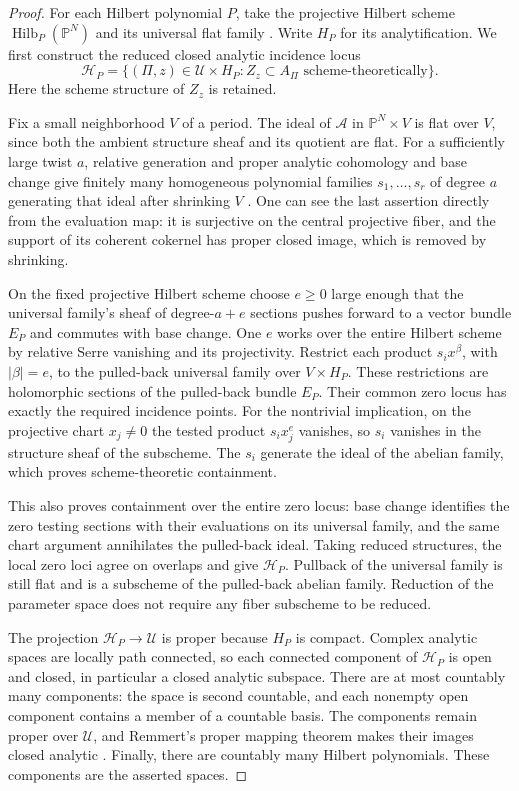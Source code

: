 \begin{proof}
For each Hilbert polynomial $P$, take the projective Hilbert scheme
$\operatorname{Hilb}_P(\mathbb P^N)$ and its universal flat family
\cite{grothendieck-hilbert}.  Write $H_P$ for its analytification.  We
first construct the reduced closed analytic incidence locus
\[
 \mathcal H_P=\{(\Pi,z)\in\mathcal U\times H_P:
                     Z_z\subset A_\Pi\text{ scheme-theoretically}\}.
\]
Here the scheme structure of $Z_z$ is retained.

Fix a small neighborhood $V$ of a period.  The ideal of $\mathscr A$
in $\mathbb P^N\times V$ is flat over $V$, since both the ambient
structure sheaf and its quotient are flat.  For a sufficiently large
twist $a$, relative generation and proper analytic cohomology and base
change give finitely many homogeneous polynomial families
$s_1,\ldots,s_r$ of degree $a$ generating that ideal after shrinking
$V$ \cite{grauert-remmert}.  One can see the last assertion directly
from the evaluation map: it is surjective on the central projective
fiber, and the support of its coherent cokernel has proper closed image,
which is removed by shrinking.

On the fixed projective Hilbert scheme choose $e\ge0$ large enough that
the universal family's sheaf of degree-$a+e$ sections pushes forward to
a vector bundle $E_P$ and commutes with base change.  One $e$ works
over the entire Hilbert scheme by relative Serre vanishing and its
projectivity.  Restrict each product $s_i x^\beta$, with $|\beta|=e$,
to the pulled-back universal family over $V\times H_P$.  These
restrictions are holomorphic sections of the pulled-back bundle $E_P$.
Their common zero locus has exactly the required incidence points.
For the nontrivial implication, on the projective chart $x_j\ne0$ the
tested product $s_i x_j^e$ vanishes, so $s_i$ vanishes in the structure
sheaf of the subscheme.  The $s_i$ generate the ideal of the abelian
family, which proves scheme-theoretic containment.

This also proves containment over the entire zero locus: base change
identifies the zero testing sections with their evaluations on its
universal family, and the same chart argument annihilates the pulled-back
ideal.  Taking reduced structures, the local zero loci agree on overlaps
and give $\mathcal H_P$.  Pullback of the universal family is still flat
and is a subscheme of the pulled-back abelian family.  Reduction of the
parameter space does not require any fiber subscheme to be reduced.

The projection $\mathcal H_P\to\mathcal U$ is proper because $H_P$ is
compact.  Complex analytic spaces are locally path connected, so each
connected component of $\mathcal H_P$ is open and closed, in particular
a closed analytic subspace.  There are at most countably many components:
the space is second countable, and each nonempty open component contains
a member of a countable basis.  The components remain proper over
$\mathcal U$, and Remmert's proper mapping theorem makes their images
closed analytic \cite{grauert-remmert}.  Finally, there are countably
many Hilbert polynomials.  These components are the asserted spaces.
\end{proof}

